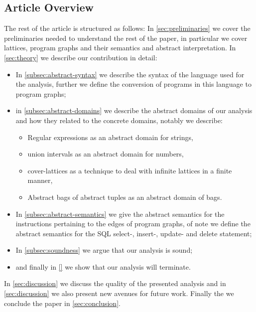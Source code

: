 \subsection{Article Overview}\label{subsec:article-overview}
The rest of the article is structured as follows:
In \autoref{sec:preliminaries} we cover the preliminaries needed to understand the rest of the paper, in particular we cover lattices, program graphs and their semantics and abstract interpretation.
In \autoref{sec:theory} we describe our contribution in detail:

\begin{itemize}
    \item In \autoref{subsec:abstract-syntax} we describe the syntax of the language used for the analysis, further we define the conversion of programs in this language to program graphs;
    \item in \autoref{subsec:abstract-domains} we describe the abstract domains of our analysis and how they related to the concrete domains, notably we describe:
    \begin{itemize}
        \item Regular expressions as an abstract domain for strings,
        \item union intervals as an abstract domain for numbers,
        \item cover-lattices as a technique to deal with infinite lattices in a finite manner,
        \item Abstract bags of abstract tuples as an abstract domain of bags.
    \end{itemize}
    \item In \autoref{subsec:abstract-semantics} we give the abstract semantics for the instructions pertaining to the edges of program graphs, of note we define the abstract semantics for the SQL select-, insert-, update- and delete statement;
    \item In \autoref{subsec:soundness} we argue that our analysis is sound;
    \item and finally in \autoref{} we show that our analysis will terminate.
\end{itemize}

In \autoref{sec:discussion} we discuss the quality of the presented analysis and in \autoref{sec:discussion} we also present new avenues for future work.
Finally the we conclude the paper in \autoref{sec:conclusion}.



